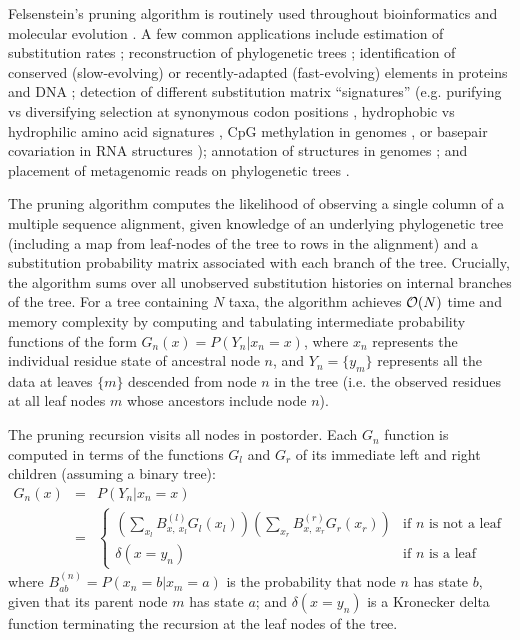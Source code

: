 \documentclass{article}
\begin{document}
Felsenstein's pruning algorithm is routinely used throughout bioinformatics and molecular evolution \cite{Felsenstein81}.
A few common applications include estimation of substitution rates \cite{Yang94b};
reconstruction of phylogenetic trees \cite{RannalaYang96};
identification of conserved (slow-evolving) or recently-adapted (fast-evolving) elements in proteins and DNA \cite{SiepelHaussler04b};
detection of different substitution matrix ``signatures''
(e.g. purifying vs diversifying selection at synonymous codon positions \cite{YangEtAl2000},
hydrophobic vs hydrophilic amino acid signatures \cite{ThorneEtAl96},
CpG methylation in genomes \cite{SiepelHaussler04},
or basepair covariation in RNA structures \cite{KnudsenHein99});
annotation of structures in genomes \cite{SiepelHaussler04c,PedersenEtAl2006};
and placement of metagenomic reads on phylogenetic trees \cite{MatsenEtAl2010}.

The pruning algorithm computes the likelihood of observing a single column of a multiple sequence alignment,
 given knowledge of an underlying phylogenetic tree (including a map from leaf-nodes of the tree to rows in the alignment)
 and a substitution probability matrix associated with each branch of the tree.
Crucially, the algorithm sums over all unobserved substitution histories on internal branches of the tree.
For a tree containing $N$ taxa, the algorithm achieves ${\cal O}(N)$ time and memory complexity by computing and tabulating intermediate probability functions of the form $G_n(x) = P(Y_n|x_n=x)$,
where $x_n$ represents the individual residue state of ancestral node $n$,
and $Y_n=\{y_m\}$ represents all the data at leaves $\{m\}$ descended from node $n$ in the tree (i.e. the observed residues at all leaf nodes $m$ whose ancestors include node $n$).

The pruning recursion visits all nodes in postorder.
Each $G_n$ function is computed in terms of the functions $G_l$ and $G_r$ of its immediate left and right children (assuming a binary tree):
\begin{eqnarray*}
G_n(x) & = & P(Y_n|x_n = x) \\
& = & \left\{
\begin{array}{ll}
\left( \sum_{x_l} B^{(l)}_{x,\ x_l} G_l(x_l) \right) \left( \sum_{x_r} B^{(r)}_{x,\ x_r} G_r(x_r) \right) & \mbox{if $n$ is not a leaf}
 \\
\delta(x=y_n) & \mbox{if $n$ is a leaf}
\end{array}
\right.
\end{eqnarray*}
where $B^{(n)}_{ab} = P(x_n=b|x_m=a)$ is the probability that node $n$ has state $b$, given that its parent node $m$ has state $a$;
and $\delta(x=y_n)$ is a Kronecker delta function terminating the recursion at the leaf nodes of the tree.
\end{document}
